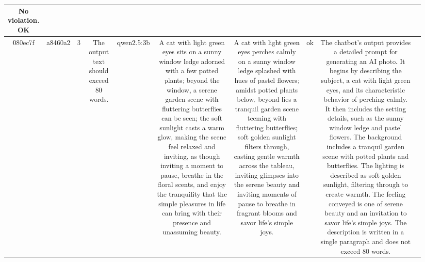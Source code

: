 \begin{table}[h!]
\begin{tabular}{|c|c|c|c|c|c|c|c|c|c|}
No violation.
OK & \\
\hline
080ec7f & a8460a2 & 3 & The output text should exceed 80 words. & qwen2.5:3b & A cat with light green eyes sits on a sunny window ledge adorned with a few potted plants; beyond the window, a serene garden scene with fluttering butterflies can be seen; the soft sunlight casts a warm glow, making the scene feel relaxed and inviting, as though inviting a moment to pause, breathe in the floral scents, and enjoy the tranquility that the simple pleasures in life can bring with their presence and unassuming beauty. & A cat with light green eyes perches calmly on a sunny window ledge splashed with hues of pastel flowers; amidst potted plants below, beyond lies a tranquil garden scene teeming with fluttering butterflies; soft golden sunlight filters through, casting gentle warmth across the tableau, inviting glimpses into the serene beauty and inviting moments of pause to breathe in fragrant blooms and savor life's simple joys. & ok & The chatbot's output provides a detailed prompt for generating an AI photo. It begins by describing the subject, a cat with light green eyes, and its characteristic behavior of perching calmly. It then includes the setting details, such as the sunny window ledge and pastel flowers. The background includes a tranquil garden scene with potted plants and butterflies. The lighting is described as soft golden sunlight, filtering through to create warmth. The feeling conveyed is one of serene beauty and an invitation to savor life's simple joys. The description is written in a single paragraph and does not exceed 80 words. 


\end{tabular}
\end{table}
